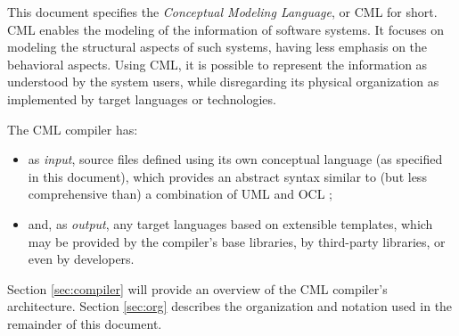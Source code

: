 This document specifies the \emph{Conceptual Modeling Language}, or CML for short.
CML enables the modeling of the information of software systems.
It focuses on modeling the structural aspects of such systems,
having less emphasis on the behavioral aspects.
Using CML,
it is possible to represent the information as understood by the system users,
while disregarding its physical organization as implemented by target languages or technologies.

The CML compiler has:
\begin{itemize}
\item as \emph{input},
source files defined using its own conceptual language (as specified in this document),
which provides an abstract syntax similar to (but less comprehensive than) a combination of UML \cite{uml} and OCL \cite{ocl};
\item and, as \emph{output},
any target languages based on extensible templates,
which may be provided by the compiler's base libraries, by third-party libraries, or even by developers.
\end{itemize}

Section \ref{sec:compiler} will provide an overview of the CML compiler's architecture.
Section \ref{sec:org} describes the organization and notation
used in the remainder of this document.
